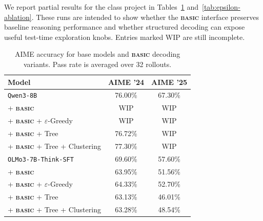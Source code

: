 \documentclass[10pt,twocolumn]{article}
\newcommand{\methodname}{\textbf{\textsf{\textsc{basic}}}}
\newcommand{\methodname}{{\sffamily\bfseries{\fontsize{0.95em}{0.95em}\selectfont BASIC}}}
\begin{document}
We report partial results for the class project in
Tables~\ref{tab:aime-results} and~\ref{tab:epsilon-ablation}. These runs are
intended to show whether the \methodname{} interface preserves baseline
reasoning performance and whether structured decoding can expose useful
test-time exploration knobs. Entries marked WIP are still incomplete.

\begin{table}[h]
  \centering
  \caption{AIME accuracy for base models and \methodname{} decoding variants.
    Pass rate is averaged over 32 rollouts.}
  \label{tab:aime-results}
  \small
  \begin{tabularx}{\columnwidth}{>{\raggedright\arraybackslash}Xcc}
    \toprule
    Model                                    & AIME '24 & AIME '25 \\
    \midrule
    \texttt{Qwen3-8B}                        & 76.00\%  & 67.30\%  \\
    + \methodname{}                          & WIP      & WIP      \\
    + \methodname{} + \(\varepsilon\)-Greedy & WIP      & WIP      \\
    + \methodname{} + Tree                   & 76.72\%  & WIP      \\
    + \methodname{} + Tree + Clustering      & 77.30\%  & WIP      \\
    \midrule
    \texttt{OLMo3-7B-Think-SFT}              & 69.60\%  & 57.60\%  \\
    + \methodname{}                          & 63.95\%  & 51.56\%  \\
    + \methodname{} + \(\varepsilon\)-Greedy & 64.33\%  & 52.70\%  \\
    + \methodname{} + Tree                   & 63.13\%  & 46.01\%  \\
    + \methodname{} + Tree + Clustering      & 63.28\%  & 48.54\%  \\
    \bottomrule
  \end{tabularx}
\end{table}
\end{document}
